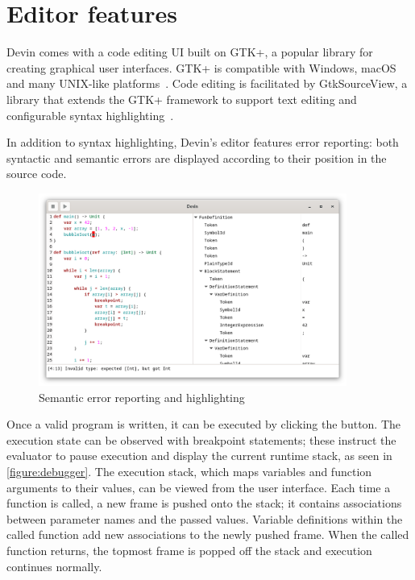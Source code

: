 \documentclass[UdineBachThesis,american,11pt]{PhdThesis}
\begin{document}
  \section{Editor features}
  \label{section:editor-features}

  Devin comes with a code editing UI built on GTK+, a popular library for
  creating graphical user interfaces. GTK+ is compatible with Windows, macOS and
  many UNIX-like platforms~\cite{gtk+}. Code editing is facilitated by
  GtkSourceView, a library that extends the GTK+ framework to support text
  editing and configurable syntax highlighting~\cite{gtksourceview}.

  In addition to syntax highlighting, Devin's editor features error reporting:
  both syntactic and semantic errors are displayed according to their position
  in the source code.

  \begin{figure}[H]
    \centering
    \includegraphics[width=0.9\textwidth]{4.png}
    \caption{Semantic error reporting and highlighting}
  \end{figure}

  \pagebreak

  Once a valid program is written, it can be executed by clicking the
  {\blacktriangleright} button. The execution state can be observed with
  breakpoint statements; these instruct the evaluator to pause execution and
  display the current runtime stack, as seen in \autoref{figure:debugger}. The
  execution stack, which maps variables and function arguments to their values,
  can be viewed from the user interface. Each time a function is called, a new
  frame is pushed onto the stack; it contains associations between parameter
  names and the passed values. Variable definitions within the called function
  add new associations to the newly pushed frame. When the called function
  returns, the topmost frame is popped off the stack and execution continues
  normally.
\end{document}
